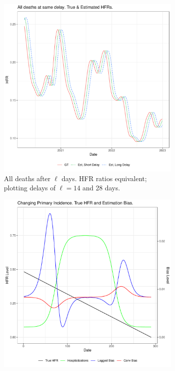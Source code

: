 \documentclass{article}
\begin{document}
\begin{figure}
     \centering
     \begin{subfigure}[b]{0.45\linewidth}
         \centering
         \includegraphics[width=\linewidth]{Figs/Simulated/sim_onehot.pdf}
         \caption{All deaths after $\ell$ days. HFR ratios equivalent; plotting delays of $\ell=14$ and 28 days.}
         \label{fig:onehot}
     \end{subfigure}
     \hfill
     \begin{subfigure}[b]{0.45\linewidth}
         \centering
         \includegraphics[width=\linewidth]{Figs/Simulated/sim_chging_primary.pdf}

\end{subfigure}
\end{figure}
\end{document}
